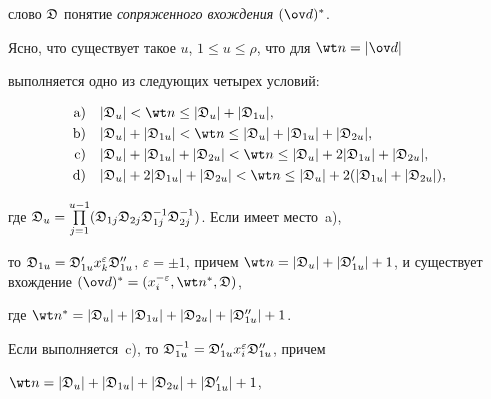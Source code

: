 слово $\frak D$ понятие {\it сопряженного вхождения} $(\ov d)^*$.


Ясно, что существует такое $u$, $1\le u\le\rho$, что для $\wt n=|\ov d|$


выполняется одно из следующих четырех условий:




\begin{equation}


\begin{split}


\text{a)} &\quad |\frak D_u|<\wt n \le|\frak D_u|+|\frak D_{1u}|,\\


\text{b)} &\quad |\frak D_u|+|\frak D_{1u}|<\wt n \le


|\frak D_u|+|\frak D_{1u}|+|\frak D_{2u}|,\\


\text{c)} &\quad |\frak D_u|+|\frak D_{1u}|+


|\frak D_{2u}|<\wt n \le|\frak D_u|+2|\frak D_{1u}|+|\frak D_{2u}|,\\


\text{d)} &\quad |\frak D_u|+2|\frak D_{1u}|+


|\frak D_{2u}|<\wt n \le|\frak D_u|+


2(|\frak D_{1u}|+|\frak D_{2u}|),


\end{split}


\label{(17.17)}


\end{equation}


где $\frak D_{u}=\PL_{j=1}^{u-1}(\frak D_{1j}\frak D_{2j}


\frak D^{-1}_{1j}\frak D^{-1}_{2j})$. Если имеет место~a),


то $\frak D_{1u}=\frak D'_{1u}x^{\varepsilon}_{k}\frak D''


_{1u}$, $\varepsilon=\pm1$, причем $\wt n=|\frak D_{u}|


+|\frak D'_{1 u}| +1$, и существует вхождение $(\ov d)^*=


(x^{-\varepsilon}_i,\wt n^*,\frak D)$,


где $\wt n^*=|\frak D_u|+|\frak D_{1u}|+|\frak D_{2u}|+|\frak D''_{1u}|+1$.


Если выполняется~c), то $\frak D^{-1}_{1u}=\frak D'_{1 u}


x^{\varepsilon}_i\frak D''_{1u}$, причем


$\wt n=|\frak D_u|+|\frak D_{1u}|+|\frak D_{2u}|+|\frak D'_{1u}|+1$,


